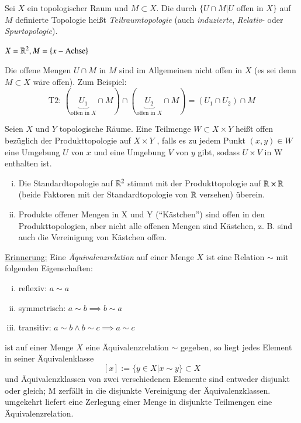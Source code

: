 \documentclass[a4paper,10pt]{scrartcl}
\begin{document}
\begin{df} Sei $ X $ ein topologischer Raum und $ M \subset X $. Die durch $ \{ U\cap M| U \text{ offen in } X \}$ auf $M$ definierte Topologie heißt \emph{Teilraumtopologie} (auch \emph{induzierte}, \emph{Relativ-} oder \emph{Spurtopologie}). 
\end{df}
\begin{ex*}
$X=\mathbb{R}^2, M=\{x-\text{Achse}\}$
\begin{figure}[ht]
\centering

\caption{}
\end{figure}
\end{ex*}
\begin{att*}
Die offene Mengen $U\cap M$ in $ M $ sind im Allgemeinen nicht offen in $ X $ (es sei denn $ M\subset X $ wäre offen). Zum Beispiel:
\[
\text{T2: } (\underbrace{U_1}_{\text{offen in }X}\cap M)\cap (\underbrace{U_2}_{\text{offen in }X}\cap M)=(U_1\cap U_2)\cap M
\]
\end{att*}
\begin{df}
Seien $ X $ und $ Y $ topologische Räume. Eine Teilmenge $ W\subset X\times Y $ heißt offen bezüglich der Produkttopologie auf $ X\times Y $ , falls es zu jedem Punkt $ (x,y)\in W $ eine Umgebung $ U $ von $ x $ und eine Umgebung $ V $ von $ y $ gibt, sodass $ U\times V $ in W enthalten ist.
\begin{figure}[ht]
\centering

\caption{}
\end{figure}
\end{df}
\begin{note*}
\begin{enumerate}[(i)]
\item Die Standardtopologie auf $ \mathbb{R}^2 $ stimmt mit der Produkttopologie auf $ \mathbb{R}\times \mathbb{R} $ (beide Faktoren mit der Standardtopologie von $ \mathbb{R} $ versehen) überein.
\item Produkte offener Mengen in X und Y ("`Kästchen"') sind offen in den Produkttopologien, aber nicht alle offenen Mengen sind Kästchen, z. B. sind auch die Vereinigung von Kästchen offen.\\
\begin{figure}[ht]
\centering

\caption{}
\end{figure}
\end{enumerate}
\underline{Erinnerung:} Eine \emph{Äquivalenzrelation} auf einer Menge $ X $ ist eine Relation $\sim$ mit folgenden Eigenschaften:
\begin{enumerate}[(i)]
\item reflexiv: $a\sim a$
\item symmetrisch: $a\sim b \implies b\sim a$
\item transitiv: $a\sim b \land b \sim c\implies a\sim c$
\end{enumerate}
ist auf einer Menge $ X $ eine Äquivalenzrelation $\sim$ gegeben, so liegt jedes Element in seiner Äquivalenklasse
\[
 [x]:=\{y\in X|x\sim y\} \subset X
\]
und Äquivalenzklassen von zwei verschiedenen Elemente sind entweder disjunkt oder gleich; M zerfällt in die disjunkte Vereinigung der Äquivalenzklassen.  umgekehrt liefert eine Zerlegung einer Menge in disjunkte Teilmengen eine Äquivalenzrelation.
\end{note*}
\end{document}
